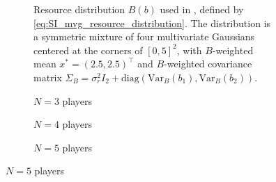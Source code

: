 \documentclass{article}
\begin{document}
    \begin{figure}[ht!]
        \centering
        \begin{subfigure}[b]{0.6\linewidth}
            \centering
                
            \caption{Resource distribution $B(b)$ used in , defined by \cref{eq:SI_mvg_resource_distribution}. The distribution is a symmetric mixture of four multivariate Gaussians centered at the corners of $[0,5]^2$, with $B$-weighted mean $x^* = (2.5, 2.5)^\top$ and $B$-weighted covariance matrix $\Sigma_B = \sigma_r^2 I_2 + \mathrm{diag}(\mathrm{Var}_B(b_1), \mathrm{Var}_B(b_2))$.}\label{fig:2d_mvg_bifurcation:a}
        \end{subfigure}

        \begin{subfigure}[b]{0.3\linewidth}
            \centering
                
            \caption{$N = 3$ players}\label{fig:2d_mvg_bifurcation:b}\vspace{4ex}
        \end{subfigure}
        \begin{subfigure}[b]{0.3\linewidth}
            \centering
                
            \caption{$N = 4$ players}\label{fig:2d_mvg_bifurcation:c}
            \vspace{4ex}
        \end{subfigure}
        \begin{subfigure}[b]{0.3\linewidth}
            \centering
                
            \caption{$N = 5$ players}\label{fig:2d_mvg_bifurcation:d}
        \vspace{4ex}
        \end{subfigure}


\end{figure}
\end{document}
